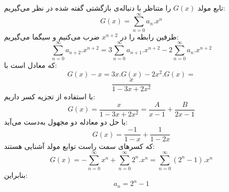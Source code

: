 	\p
تابع مولد
$G(x)$
را متناظر با دنباله‌ی بازگشتی گفته شده در نظر می‌گیریم:
$$G(x) = \sum\limits_{n=0}^{\infty}a_n.x^n$$
طرفین رابطه را در 
$x^{n+2}$
ضرب می‌کنیم و سیگما می‌گیریم:
$$\sum\limits_{n=0}^{\infty}a_{n+2}.x^{n+2} = 3\sum\limits_{n=0}^{\infty}a_{n+1}.x^{n+2} - 2\sum\limits_{n=0}^{\infty}a_n.x^{n+2}$$
که معادل است با:
$$G(x) - x = 3x.G(x) - 2x^2.G(x) = $$
$$\frac{x}{1-3x+2x^2}$$
با استفاده از تجزیه کسر داریم:
$$G(x) = \frac{x}{1-3x+2x^2} = \frac{A}{x-1} + \frac{B}{2x-1}$$
با حل دو معادله دو مجهول به‌دست می‌آید:
$$G(x) = \frac{-1}{1-x} + \frac{1}{1-2x}$$
که کسرهای سمت راست توابع مولد آشنایی هستند:
$$G(x) = -\sum\limits_{n=0}^{\infty}x^n + \sum\limits_{n=0}^{\infty}2^n.x^n = \sum\limits_{n=0}^{\infty}(2^n - 1).x^n$$
بنابراین:
$$a_n = 2^n - 1$$
